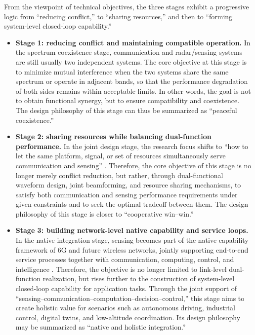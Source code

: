 From the viewpoint of technical objectives, the three stages exhibit a progressive logic from ``reducing conflict,'' to ``sharing resources,'' and then to ``forming system-level closed-loop capability.''
\begin{itemize}
    \item \textbf{Stage 1: reducing conflict and maintaining compatible operation.}  
    In the spectrum coexistence stage, communication and radar/sensing systems are still usually two independent systems. The core objective at this stage is to minimize mutual interference when the two systems share the same spectrum or operate in adjacent bands, so that the performance degradation of both sides remains within acceptable limits. In other words, the goal is not to obtain functional synergy, but to ensure compatibility and coexistence. The design philosophy of this stage can thus be summarized as ``peaceful coexistence.''
    
    \item \textbf{Stage 2: sharing resources while balancing dual-function performance.}  
    In the joint design stage, the research focus shifts to ``how to let the same platform, signal, or set of resources simultaneously serve communication and sensing'' \cite{Zhang2021ISAC6G,Hassanien2015dual}. Therefore, the core objective of this stage is no longer merely conflict reduction, but rather, through dual-functional waveform design, joint beamforming, and resource sharing mechanisms, to satisfy both communication and sensing performance requirements under given constraints and to seek the optimal tradeoff between them. The design philosophy of this stage is closer to ``cooperative win--win.''
    
    \item \textbf{Stage 3: building network-level native capability and service loops.}  
    In the native integration stage, sensing becomes part of the native capability framework of 6G and future wireless networks, jointly supporting end-to-end service processes together with communication, computing, control, and intelligence \cite{Saad2020Vision6G,Zhang2020perceptive,Cui2024integrated}. Therefore, the objective is no longer limited to link-level dual-function realization, but rises further to the construction of system-level closed-loop capability for application tasks. Through the joint support of ``sensing--communication--computation--decision--control,'' this stage aims to create holistic value for scenarios such as autonomous driving, industrial control, digital twins, and low-altitude coordination. Its design philosophy may be summarized as ``native and holistic integration.''
\end{itemize}

